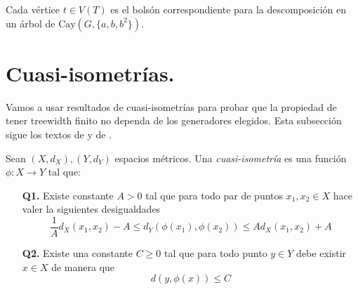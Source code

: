 \documentclass[tesis.tex]{subfiles}
\begin{document}
\begin{ej}
\begin{figure}[H]
\end{figure}


Cada vértice $t \in V(T)$ es el bolsón correspondiente para la descomposición en un árbol de $\text{Cay}(G,\{ a,b,b^2 \})$.	
\end{ej}


\section{Cuasi-isometrías.}\label{secc_qi}

Vamos a usar resultados de cuasi-isometrías para probar que la propiedad de tener treewidth finito no dependa de los generadores elegidos.
Esta subsección sigue los textos de \cite{bridson2013metric} y de \cite{loh2017geometric}.

\begin{deff}
	Sean $(X,d_X),(Y,d_Y)$ espacios métricos. 
	Una \emph{cuasi-isometría} es una función $\phi:X \to Y$ tal que:
	\begin{itemize}
		\item[\textbf{Q1.}] Existe constante $A > 0$ tal que para todo par de puntos $x_1,x_2 \in X$ hace valer la siguientes desigualdades
		\[
		\frac{1}{A} d_X(x_1,x_2) - A \le d_Y(\phi(x_1),\phi(x_2)) \le A d_X(x_1,x_2) + A
		\]
		\item[\textbf{Q2.}] Existe una constante $C \ge 0$ tal que para todo punto $y \in Y$ debe existir $x \in X$ de manera que 
		\[
		d(y,\phi(x)) \le C
		\]
	\end{itemize}
\end{deff}
\end{document}
